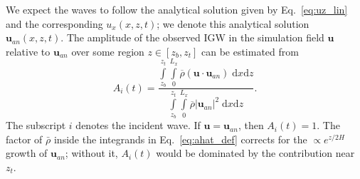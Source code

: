 \documentclass[
        fleqn,
        usenatbib,
    ]{mnras}
\newcommand*{\abs}[1]{\left|#1\right|}
\newcommand*{\p}[1]{\left(#1\right)}
\newcommand*{\bm}[1]{\mathbf{#1}}
\begin{document}
We expect the waves to follow the analytical solution given by
Eq.~\eqref{eq:uz_lin} and the corresponding $u_x(x, z, t)$; we denote this
analytical solution $\bm{u}_{an}(x, z, t)$. The amplitude of the observed IGW in the
simulation field $\bm{u}$ relative to $\bm{u}_{an}$ over
some region $z \in [z_b, z_t]$ can be estimated from
\begin{equation}
    A_i(t) = \frac{\int\limits_{z_b}^{z_t}\int\limits_0^{L_x}
        \overline{\rho}\p{\bm{u} \cdot \bm{u}_{an}}\;\mathrm{d}x\mathrm{d}z}
        {\int\limits_{z_b}^{z_t}\int\limits_0^{L_x}
        \overline{\rho}\abs{\bm{u}_{an}}^2\;\mathrm{d}x\mathrm{d}z}.
        \label{eq:ahat_def}
\end{equation}
The subscript $i$ denotes the incident wave. If $\bm{u} = \bm{u}_{an}$, then
$A_i(t) = 1$. The factor of $\bar{\rho}$ inside the integrands
in Eq.~\eqref{eq:ahat_def} corrects for the $\propto e^{z/2H}$ growth of
$\bm{u}_{an}$; without it, $A_i(t)$ would be dominated by the contribution near
$z_t$.
\end{document}
